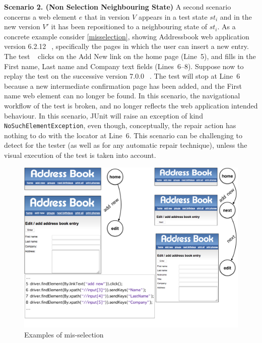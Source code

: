 \noindent
\textbf{Scenario 2. (Non Selection Neighbouring State)} A second scenario concerns a web element $e$ that in version $V$ appears in a test state $st_i$ and in the new version $V'$ it has been repositioned to a neighbouring state of $st_i$. 
As a concrete example consider \autoref{misselection}, showing Addressbook web application version 6.2.12~\textcircled{}, specifically the pages in which the user can insert a new entry. The test~\textcircled{} clicks on the Add New link on the home page (Line~5), and fills in the First name, Last name and Company text fields (Lines~6--8).
Suppose now to replay the test on the successive version 7.0.0~\textcircled{}. The test will stop at Line~6 because a new intermediate confirmation page has been added, and the First name web element can no longer be found. In this scenario, the navigational workflow of the test is broken, and no longer reflects the web application intended behaviour.
In this scenario, JUnit will raise an exception of kind \texttt{NoSuchElementException}, even though, conceptually, the repair action has nothing to do with the locator at Line~6. 
This scenario can be challenging to detect for the tester (as well as for any automatic repair technique), unless the visual execution of the test is taken into account.

\begin{figure}[t]
\centering
\includegraphics[trim={0cm 1cm 0cm 0cm},clip,scale=0.23]{images/misselection}
\caption{Examples of mis-selection}
\label{misselection}
\end{figure}

